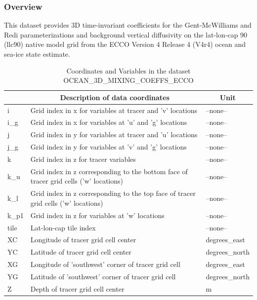 \subsubsection{Overview}
This dataset provides 3D time-invariant coefficients for the Gent-McWilliams and Redi parameterizations and background vertical diffusivity on the lat-lon-cap 90 (llc90) native model grid from the ECCO Version 4 Release 4 (V4r4) ocean and sea-ice state estimate. 
\begin{longtable}{|m{}|m{}|m{}|}
\caption{Coordinates and Variables in the dataset OCEAN\_3D\_MIXING\_COEFFS\_ECCO}
\label{tab:table-OCEAN_3D_MIXING_COEFFS_ECCO-fields} \\ 
\hline \endhead \hline \endfoot
\rowcolor{lightgray} \multicolumn{1}{|c|}{\textbf{Coordinates}} & \multicolumn{1}{|c|}{\textbf{Description of data coordinates}} &  \multicolumn{1}{|c|}{\textbf{Unit}}\\ \hline
i &Grid index in x for variables at tracer and 'v' locations &--none--  \\ \hline
i\_g &Grid index in x for variables at 'u' and 'g' locations &--none--  \\ \hline
j &Grid index in y for variables at tracer and 'u' locations &--none--  \\ \hline
j\_g &Grid index in y for variables at 'v' and 'g' locations &--none--  \\ \hline
k &Grid index in z for tracer variables &--none--  \\ \hline
k\_u &Grid index in z corresponding to the bottom face of tracer grid cells ('w' locations) &--none--  \\ \hline
k\_l &Grid index in z corresponding to the top face of tracer grid cells ('w' locations) &--none--  \\ \hline
k\_p1 &Grid index in z for variables at 'w' locations &--none--  \\ \hline
tile &Lat-lon-cap tile index &--none--  \\ \hline
XC &Longitude of tracer grid cell center &degrees\_east  \\ \hline
YC &Latitude of tracer grid cell center &degrees\_north  \\ \hline
XG &Longitude of 'southwest' corner of tracer grid cell &degrees\_east  \\ \hline
YG &Latitude of 'southwest' corner of tracer grid cell &degrees\_north  \\ \hline
Z &Depth of tracer grid cell center &m  \\ \hline

\end{longtable}

